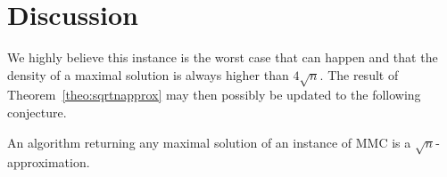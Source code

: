



\section{Discussion}

We highly believe this instance is the worst case that can happen and that the density of a maximal solution is always higher than $4\sqrt{n}$. The result of Theorem~\ref{theo:sqrtnapprox} may then possibly be updated to the following conjecture. 

\begin{conjecture}
	An algorithm returning any maximal solution of an instance of MMC is a $\sqrt{n}$-approximation.
\end{conjecture}